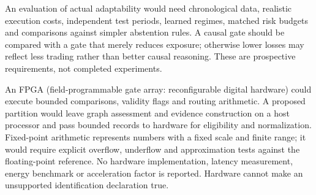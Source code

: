 An evaluation of actual adaptability would need chronological data, realistic execution costs, independent test periods, learned regimes, matched risk budgets and comparisons against simpler abstention rules. A causal gate should be compared with a gate that merely reduces exposure; otherwise lower losses may reflect less trading rather than better causal reasoning. These are prospective requirements, not completed experiments.

An FPGA (field-programmable gate array: reconfigurable digital hardware) could execute bounded comparisons, validity flags and routing arithmetic. A proposed partition would leave graph assessment and evidence construction on a host processor and pass bounded records to hardware for eligibility and normalization. Fixed-point arithmetic represents numbers with a fixed scale and finite range; it would require explicit overflow, underflow and approximation tests against the floating-point reference. No hardware implementation, latency measurement, energy benchmark or acceleration factor is reported. Hardware cannot make an unsupported identification declaration true.
